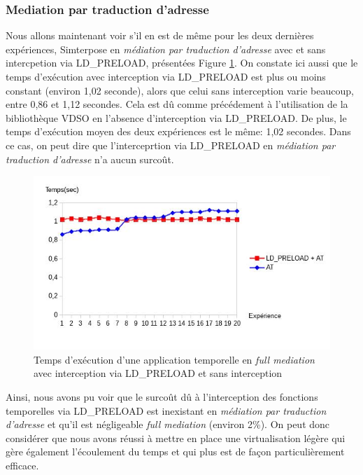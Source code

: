 \subsubsection{Mediation par traduction d'adresse}
Nous allons maintenant voir s'il en est de même pour les deux dernières expériences, Simterpose en \textit{médiation par traduction d'adresse} avec et sans intercpetion via LD\_PRELOAD, présentées Figure \ref{Temps_AT}. On constate ici aussi que le temps d'exécution avec interception via LD\_PRELOAD est plus ou moins constant (environ 1,02 seconde), alors que celui sans interception varie beaucoup, entre 0,86 et 1,12 secondes. Cela est dû comme précédement à l'utilisation de la bibliothèque VDSO en l'absence d'interception via LD\_PRELOAD. De plus, le temps d'exécution moyen des deux expériences est le même: 1,02 secondes. Dans ce cas, on peut dire que l'interceprtion via LD\_PRELOAD en \textit{médiation par traduction d'adresse} n'a aucun surcoût.

\begin{figure}
  \centering
    \includegraphics[scale=0.65]{mesures/graph/Temps_AT.jpg}
    \caption{Temps d'exécution d'une application temporelle en \textit{full mediation} avec interception via LD\_PRELOAD et sans interception}
    \label{Temps_AT}
\end{figure}

Ainsi, nous avons pu voir que le surcoût dû à l'interception des fonctions temporelles via LD\_PRELOAD est inexistant en \textit{médiation par traduction d'adresse} et qu'il est négligeable \textit{full mediation} (environ 2\%). On peut donc considérer que nous avons réussi à mettre en place une virtualisation légère qui gère également l'écoulement du temps et qui plus est de façon particulièrement efficace.

\vspace{0.5cm}
